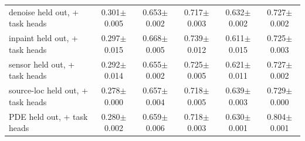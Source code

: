 \begin{tabular}{lccccc}
denoise held out, + task heads & \cellcolor{blue!10}0.301{\scriptsize$\pm$0.005} & 0.653{\scriptsize$\pm$0.002} & 0.717{\scriptsize$\pm$0.003} & 0.632{\scriptsize$\pm$0.002} & 0.727{\scriptsize$\pm$0.002} \\
inpaint held out, + task heads & 0.297{\scriptsize$\pm$0.015} & \cellcolor{blue!10}0.668{\scriptsize$\pm$0.005} & 0.739{\scriptsize$\pm$0.012} & 0.611{\scriptsize$\pm$0.015} & 0.725{\scriptsize$\pm$0.003} \\
sensor held out, + task heads & 0.292{\scriptsize$\pm$0.014} & 0.655{\scriptsize$\pm$0.002} & \cellcolor{blue!10}0.725{\scriptsize$\pm$0.005} & 0.621{\scriptsize$\pm$0.011} & 0.727{\scriptsize$\pm$0.002} \\
source-loc held out, + task heads & 0.278{\scriptsize$\pm$0.000} & 0.657{\scriptsize$\pm$0.004} & 0.718{\scriptsize$\pm$0.005} & \cellcolor{blue!10}0.639{\scriptsize$\pm$0.003} & 0.729{\scriptsize$\pm$0.000} \\
PDE held out, + task heads & 0.280{\scriptsize$\pm$0.002} & 0.659{\scriptsize$\pm$0.006} & 0.718{\scriptsize$\pm$0.003} & 0.630{\scriptsize$\pm$0.001} & \cellcolor{blue!10}0.804{\scriptsize$\pm$0.001} \\
\bottomrule
\end{tabular}
